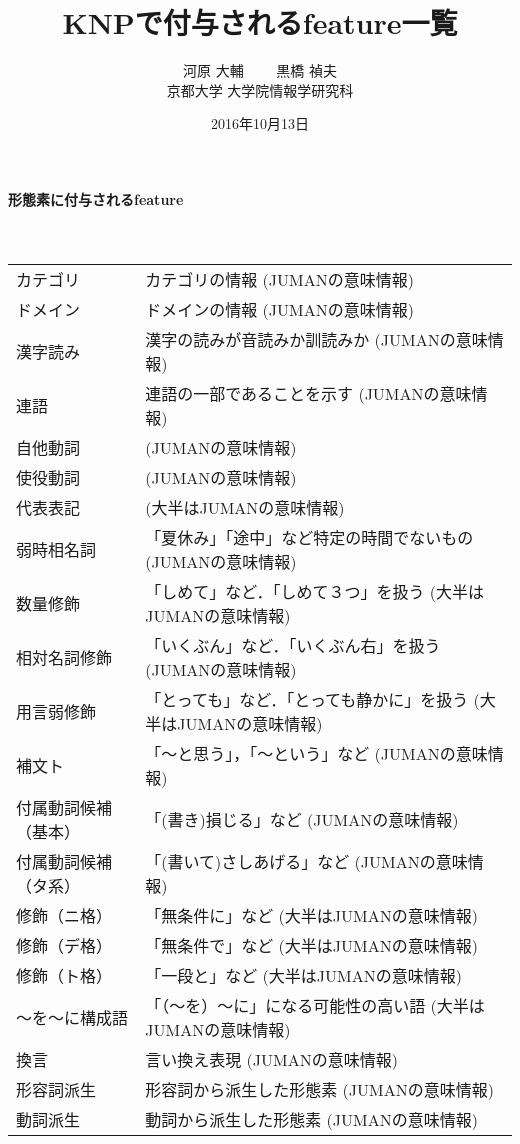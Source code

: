 \documentclass[a4j]{jarticle}
\title{KNPで付与されるfeature一覧}
\date{2016年10月13日}
\author{河原 大輔 \ \ \ \  黒橋 禎夫\\京都大学 大学院情報学研究科}
\begin{document}
\maketitle

\paragraph{形態素に付与されるfeature} \ \\

\begin{supertabular}{p{4.2cm}p{9.6cm}}
カテゴリ & カテゴリの情報 (JUMANの意味情報)\\
ドメイン & ドメインの情報 (JUMANの意味情報)\\
漢字読み & 漢字の読みが音読みか訓読みか (JUMANの意味情報)\\
連語 & 連語の一部であることを示す (JUMANの意味情報)\\
自他動詞 & (JUMANの意味情報)\\
使役動詞 & (JUMANの意味情報)\\
代表表記 & (大半はJUMANの意味情報)\\
弱時相名詞 & 「夏休み」「途中」など特定の時間でないもの (JUMANの意味情報)\\
数量修飾 & 「しめて」など．「しめて３つ」を扱う (大半はJUMANの意味情報)\\
相対名詞修飾 & 「いくぶん」など．「いくぶん右」を扱う (JUMANの意味情報)\\
用言弱修飾 & 「とっても」など．「とっても静かに」を扱う (大半はJUMANの意味情報)\\
補文ト & 「〜と思う」，「〜という」など (JUMANの意味情報)\\
付属動詞候補（基本） & 「(書き)損じる」など (JUMANの意味情報)\\
付属動詞候補（タ系） & 「(書いて)さしあげる」など (JUMANの意味情報)\\
修飾（ニ格） & 「無条件に」など (大半はJUMANの意味情報)\\
修飾（デ格） & 「無条件で」など (大半はJUMANの意味情報)\\
修飾（ト格） & 「一段と」など   (大半はJUMANの意味情報)\\
〜を〜に構成語 & 「（〜を）〜に」になる可能性の高い語  (大半はJUMANの意味情報)\\
換言 & 言い換え表現 (JUMANの意味情報)\\
形容詞派生 & 形容詞から派生した形態素 (JUMANの意味情報)\\
動詞派生 & 動詞から派生した形態素 (JUMANの意味情報)\\

\end{supertabular}
\end{document}
